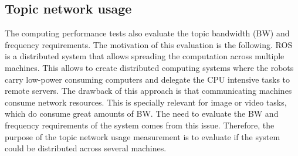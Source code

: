 


		\subsection{Topic network usage}

		The computing performance tests also evaluate the topic bandwidth (BW) and frequency requirements. 
		The motivation of this evaluation is the following.
		ROS is a distributed system that allows spreading the computation across multiple machines. 
		This allows to create distributed computing systems where the robots carry low-power consuming computers and delegate the CPU intensive tasks to remote servers.	
		The drawback of this approach is that communicating machines consume network resources. 
		This is specially relevant for image or video tasks, which do consume great amounts of BW. 
		The need to evaluate the BW and frequency requirements of the system comes from this issue. 
		Therefore, the purpose of the topic network usage measurement is to evaluate if the system could be distributed across several machines.

	

